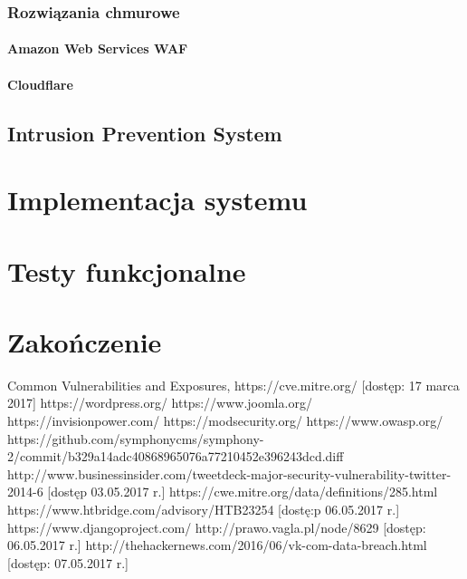 \documentclass[11pt,a4paper,polish,thesis,oneside]{dcsbook}
\begin{document}
\subsection{Rozwiązania chmurowe}
\subsubsection{Amazon Web Services WAF}
\subsubsection{Cloudflare}

\section{Intrusion Prevention System}

\chapter{Implementacja systemu}

\chapter{Testy funkcjonalne}


\chapter{Zakończenie}

\backmatter

\begin{thebibliography}{1}
 Common Vulnerabilities and Exposures, https://cve.mitre.org/ [dostęp: 17 marca 2017]
 https://wordpress.org/
 https://www.joomla.org/
 https://invisionpower.com/
 https://modsecurity.org/
 https://www.owasp.org/
 https://github.com/symphonycms/symphony-2/commit/b329a14adc40868965076a77210452e396243dcd.diff
 http://www.businessinsider.com/tweetdeck-major-security-vulnerability-twitter-2014-6 [dostęp 03.05.2017 r.]
 https://cwe.mitre.org/data/definitions/285.html
 https://www.htbridge.com/advisory/HTB23254 [dostę:p 06.05.2017 r.]
 https://www.djangoproject.com/
 http://prawo.vagla.pl/node/8629 [dostęp: 06.05.2017 r.]
 http://thehackernews.com/2016/06/vk-com-data-breach.html [dostęp: 07.05.2017 r.]

\end{thebibliography}
\end{document}
